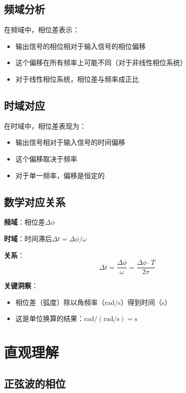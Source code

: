 \documentclass[12pt,a4paper]{article}
\begin{document}
\subsection{频域分析}

在频域中，相位差表示：
\begin{itemize}
\item 输出信号的相位相对于输入信号的相位偏移
\item 这个偏移在所有频率上可能不同（对于非线性相位系统）
\item 对于线性相位系统，相位差与频率成正比
\end{itemize}

\subsection{时域对应}

在时域中，相位差表现为：
\begin{itemize}
\item 输出信号相对于输入信号的时间偏移
\item 这个偏移取决于频率
\item 对于单一频率，偏移是恒定的
\end{itemize}

\subsection{数学对应关系}

\textbf{频域}：相位差$\Delta \phi$

\textbf{时域}：时间滞后$\Delta t = \Delta \phi / \omega$

\textbf{关系}：
\begin{equation}
\Delta t = \frac{\Delta \phi}{\omega} = \frac{\Delta \phi \cdot T}{2\pi}
\end{equation}

\textbf{关键洞察}：
\begin{itemize}
\item 相位差（弧度）除以角频率（rad/s）得到时间（s）
\item 这是单位换算的结果：$\text{rad} / (\text{rad/s}) = \text{s}$
\end{itemize}

\section{直观理解}

\subsection{正弦波的相位}
\end{document}
